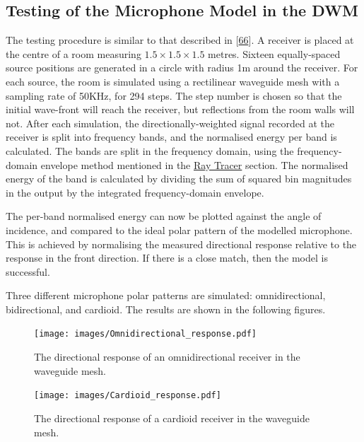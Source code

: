 \documentclass[]{scrreprt}
\begin{document}
\subsection{Testing of the Microphone Model in the
DWM}\label{testing-of-the-microphone-model-in-the-dwm}

The testing procedure is similar to that described in
{[}\protect\hyperlink{ref-hacihabibogluux5fsimulationux5f2010}{66}{]}. A
receiver is placed at the centre of a room measuring
\(1.5 \times 1.5 \times 1.5\) metres. Sixteen equally-spaced source
positions are generated in a circle with radius 1m around the receiver.
For each source, the room is simulated using a rectilinear waveguide
mesh with a sampling rate of 50KHz, for 294 steps. The step number is
chosen so that the initial wave-front will reach the receiver, but
reflections from the room walls will not. After each simulation, the
directionally-weighted signal recorded at the receiver is split into
frequency bands, and the normalised energy per band is calculated. The
bands are split in the frequency domain, using the frequency-domain
envelope method mentioned in the
\href{\%7B\%7B\%20site.baseurl\%20\%7D\%7D\%7B\%\%20link\%20ray_tracer.md\%20\%\%7D}{Ray
Tracer} section. The normalised energy of the band is calculated by
dividing the sum of squared bin magnitudes in the output by the
integrated frequency-domain envelope.

The per-band normalised energy can now be plotted against the angle of
incidence, and compared to the ideal polar pattern of the modelled
microphone. This is achieved by normalising the measured directional
response relative to the response in the front direction. If there is a
close match, then the model is successful.

Three different microphone polar patterns are simulated:
omnidirectional, bidirectional, and cardioid. The results are shown in
the following
figures.

\begin{figure}[htbp]
\centering
\texttt{[image: images/Omnidirectional\_response.pdf]}
\caption{The directional response of an omnidirectional receiver in the
waveguide mesh.\label{fig:omnidirectional}}
\end{figure}

\begin{figure}[htbp]
\centering
\texttt{[image: images/Cardioid\_response.pdf]}
\caption{The directional response of a cardioid receiver in the
waveguide mesh.\label{fig:cardioid}}
\end{figure}
\end{document}
